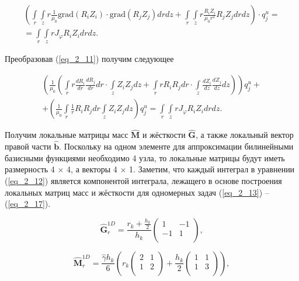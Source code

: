 \begin{equation} \label{eq_2_11}
\begin{gathered}
	\left( \int \limits_{r} \int \limits_{z} r \frac{1}{\mu_0} \text{grad} (R_i Z_i) \cdot \text{grad} (R_j Z_j) dr dz + \int \limits_{r} \int \limits_{z} r  \frac{R_i Z_i}{\mu_0 r^2} R_j Z_j dr dz \right) \cdot q_j^u = \\ = \int \limits_{r} \int \limits_{z} r  J_{\varphi} R_i Z_i dr dz.
\end{gathered}
\end{equation}

Преобразовав (\ref{eq_2_11}) получим следующее

\begin{equation} \label{eq_2_12}
\begin{gathered}
	\left(\frac{1}{\mu_0} \left(\int \limits_{r} r \frac{d R_i}{dr} \frac{d R_j}{dr} dr \cdot \int \limits_{z} Z_i Z_j dz + \int \limits_{r} r R_i R_j dr \cdot \int \limits_{z} \frac{d Z_i}{dz} \frac{d Z_j}{dz} dz\right) \right) q_j^u + \\ + \left( \frac{1}{\mu_0} \int \limits_{r} \frac{1}{r} R_i R_j dr \int \limits_{z} Z_i Z_j dz \right) q_j^u = \int \limits_{r} \int \limits_{z} r  J_{\varphi} R_i Z_i dr dz.
\end{gathered}
\end{equation}

Получим локальные матрицы масс $\hat{\textbf{M}}$ и жёсткости $\hat{\textbf{G}}$, а также локальный вектор правой части $\hat{\textbf{b}}$. Поскольку на одном элементе для аппроксимации билинейными базисными функциями необходимо 4 узла, то локальные матрицы будут иметь размерность 4 $\times$ 4, а векторы 4 $\times$ 1. Заметим, что каждый интеграл в уравнении (\ref{eq_2_12}) является компонентой интеграла, лежащего в основе построения локальных матриц масс и жёсткости для одномерных задач (\ref{eq_2_13}) -- (\ref{eq_2_17}).

\begin{equation} \label{eq_2_13}
	\hat{\textbf{G}}_r^{1D} = \frac{r_k + \frac{h_k}{2}}{h_k} \left(
	\begin{array}{rr}
		1 & -1\\
		-1 &  1\\
	\end{array}
	\right),
\end{equation}

\begin{equation} \label{eq_2_14}
	\hat{\textbf{M}}_r^{1D} = \frac{\hat{\gamma} h_k}{6} \left( r_k \left(
	\begin{array}{rr}
		2 & 1\\
		1 & 2\\
	\end{array}
	\right) + \frac{h_k}{2} \left(
	\begin{array}{rr}
		1 & 1\\
		1 & 3\\
	\end{array}
	\right) \right),
\end{equation}


